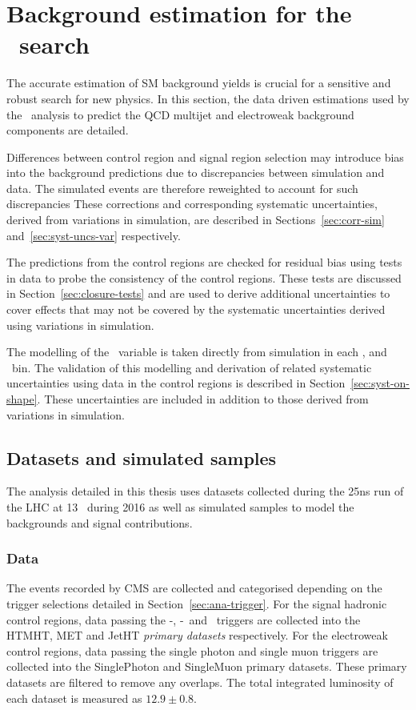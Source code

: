 \chapter{Background estimation for the \alphat~search}
\label{cha:backgroundPrediction}

The accurate estimation of SM background yields is crucial for a sensitive and robust
search for new physics. In this section, the data driven estimations used by
the \alphat~analysis to predict the QCD multijet and electroweak 
background components are detailed. 

Differences between control region and signal 
region selection may introduce bias into the background predictions
due to discrepancies between simulation and data. 
The simulated events are therefore reweighted to account for such discrepancies
These corrections and corresponding systematic uncertainties, derived
from variations in simulation, are described in Sections~\ref{sec:corr-sim} 
and~\ref{sec:syst-uncs-var} respectively.  

The predictions from the control regions are checked for residual bias 
using tests in data to probe the consistency of the control regions. 
These tests are discussed in Section~\ref{sec:closure-tests} and 
are used to derive additional uncertainties to cover effects 
that may not be covered by the systematic uncertainties derived 
using variations in simulation.

The modelling of the \mht~variable is taken directly from simulation in each \nj, \nb
and \scalht~bin. The validation of this modelling 
and derivation of related systematic uncertainties using data in the 
control regions is described in Section~\ref{sec:syst-on-shape}. These uncertainties 
are included in addition to those derived from variations in simulation.

\section{Datasets and simulated samples}

The analysis detailed in this thesis uses datasets collected during the 25ns run of the 
LHC at 13 \TeV~during 2016 as well as simulated samples to model the backgrounds and
signal contributions.

\subsection{Data}
The events recorded by CMS are collected and categorised depending on the trigger selections
detailed in Section~\ref{sec:ana-trigger}. For the signal hadronic control regions, data passing the \alphat-\scalht,
\mht-\met~and \scalht~triggers are collected into the HTMHT, MET and JetHT \emph{primary datasets} respectively.
For the electroweak control regions, data passing the single photon and single muon triggers are collected 
into the SinglePhoton and SingleMuon primary datasets. These primary datasets are filtered to remove
any overlaps. The total integrated luminosity of each dataset is measured as $12.9\pm0.8$\ifb.

